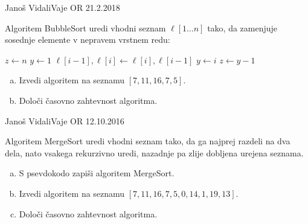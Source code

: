 \begin{naloga}{}{Janoš Vidali}{Vaje OR 21.2.2018}
\begin{vprasanje}
Algoritem {\sc BubbleSort} uredi vhodni seznam $\ell[1 \dots n]$ tako,
da zamenjuje sosednje elemente v nepravem vrstnem redu:
\begin{small}
\begin{algorithmic}
    \State $z \gets n$
        \State $y \gets 1$
            \If{$\ell[i-1] > \ell[i]$}
                \State $\ell[i-1], \ell[i] \gets \ell[i], \ell[i-1]$
                \State $y \gets i$
            \EndIf
        \EndFor
        \State $z \gets y-1$
    \EndWhile
\EndFunction
\end{algorithmic}
\end{small}

\begin{enumerate}[(a)]
\item Izvedi algoritem na seznamu $[7, 11, 16, 7, 5]$.
\item Določi časovno zahtevnost algoritma.
\end{enumerate}

\end{vprasanje}
\begin{odgovor}
\end{odgovor}
\end{naloga}


\begin{naloga}{}{Janoš Vidali}{Vaje OR 12.10.2016}
\begin{vprasanje}
Algoritem {\sc MergeSort} uredi vhodni seznam tako,
da ga najprej razdeli na dva dela,
nato vsakega rekurzivno uredi,
nazadnje pa zlije dobljena urejena seznama.
\begin{enumerate}[(a)]
\item S psevdokodo zapiši algoritem {\sc MergeSort}.
\item Izvedi algoritem na seznamu $[7, 11, 16, 7, 5, 0, 14, 1, 19, 13]$.
\item Določi časovno zahtevnost algoritma.
\end{enumerate}

\end{vprasanje}
\begin{odgovor}
\end{odgovor}
\end{naloga}


